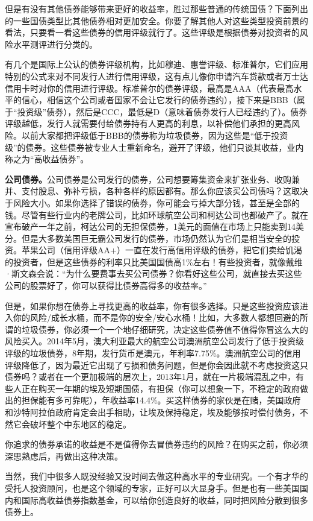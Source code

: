 但是有没有其他债券能够带来更好的收益率，胜过那些普通的传统国债？下面列出的一些国债类型比其他债券相对更加安全。你要了解其他人对这些类型投资前景的看法，只要看一看这些债券的信用评级就行了。这些评级是根据债券对投资者的风险水平测评进行分类的。

有几个是国际上公认的债券评级机构，比如穆迪、惠誉评级、标准普尔，它们应用特别的公式来对不同发行人进行信用评级，这有点儿像你申请汽车贷款或者万士达信用卡时对你的信用进行评级。标准普尔的债券评级，最高是AAA（代表最高水平的信心，相信这个公司或者国家不会让它发行的债券违约），接下来是BBB（属于“投资级”债券），然后是CCC，最低是D（意味着债券发行人已经违约了）。债券评级越低，发行人就需要付给债券持有人更高的利息，以补偿他们承担的更高风险。以前大家都把评级低于BBB的债券称为垃圾债券，因为这些是“低于投资级”的债券。这些债券被专业人士重新命名，避开了评级，他们只谈其收益，业内称之为“高收益债券”。

\textbf{公司债券。}公司债券是公司发行的债券，公司想要筹集资金来扩张业务、收购兼并、支付股息、弥补亏损，各种各样的原因都有。那么你应该买公司债吗？这取决于风险大小。如果你选择了错误的债券，你可能会亏掉大部分钱，甚至是全部的钱。尽管有些行业内的老牌公司，比如环球航空公司和柯达公司也都破产了。就在宣布破产一年之前，柯达公司的无担保债券，1美元的面值在市场上只能卖到14美分。但是大多数美国巨无霸公司发行的债券，市场仍然认为它们是相当安全的投资。苹果公司（信用评级AA+）一直在发行高信用评级的债券，把它们卖给饥渴的投资者，但是这些债券的利率只比美国国债高1\%左右！有些投资者，就像戴维·斯文森会说：“为什么要费事去买公司债券？你看好这些公司，就直接去买这些公司的股票好了，你可以获得比债券高得多的收益率。”

但是，如果你想在债券上寻找更高的收益率，你有很多选择。只是这些投资应该进入你的风险/成长水桶，而不是你的安全/安心水桶！比如，大多数人都想回避的所谓的垃圾债券，你必须一个一个地仔细研究，决定这些债券值不值得你冒这么大的风险买入。2014年5月，澳大利亚最大的航空公司澳洲航空公司发行了低于投资级评级的垃圾债券，8年期，发行货币是澳元，年利率7.75\%。澳洲航空公司的信用评级降低了，因为最近它出现了亏损和债务问题，但是你会因此就不考虑投资这只债券吗？或者在一个更加极端的层次上，2013年1月，就在一片极端混乱之中，有些人正在购买一年期的埃及短期国债，有担保（你可以想象一下，不稳定的政府做出的担保能有多可靠呢），年收益率14.4\%。买这样债券的家伙是在赌，美国政府和沙特阿拉伯政府肯定会出手相助，让埃及保持稳定，埃及能够按时偿付债务，不然它会破坏整个中东地区的稳定。

你追求的债券承诺的收益是不是值得你去冒债券违约的风险？在购买之前，你必须深思熟虑后，再做出这种决策。

当然，我们中很多人既没经验又没时间去做这种高水平的专业研究。一个有才华的受托人投资顾问，也是这个领域的专家，正好可以大显身手。但是也有一些美国国内和国际高收益债券指数基金，可以给你创造良好的收益，同时把风险分散到很多债券上。

